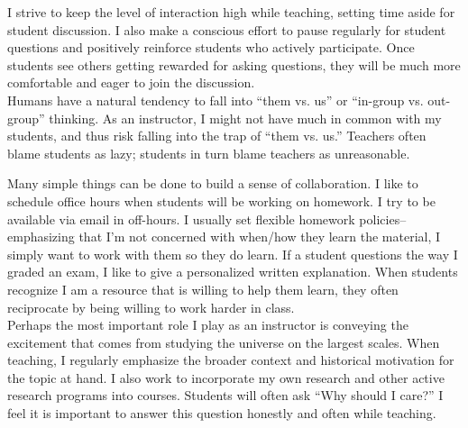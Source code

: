 \documentclass[11pt]{article}
\begin{document}
I strive to keep the level of interaction high while teaching, setting time aside for student discussion.  I also make a conscious effort to pause regularly for student questions and positively reinforce students who actively participate.  Once students see others getting rewarded for asking questions, they will be much more comfortable and eager to join the discussion. \\


 Humans have a natural tendency to fall into ``them vs. us'' or ``in-group vs. out-group'' thinking.  As an instructor, I might not have much in common with my students, and thus risk falling into the trap of ``them vs. us.''  Teachers often blame students as lazy; students in turn blame teachers as unreasonable.  

Many simple things can be done to build a sense of collaboration.  I like to schedule office hours when students will be working on homework.  I try to be available via email in off-hours.  I usually set flexible homework policies--emphasizing that I'm not concerned with when/how they learn the material, I simply want to work with them so they do learn.  If a student questions the way I graded an exam, I like to give a personalized written explanation.  When students recognize I am a resource that is willing to help them learn, they often reciprocate by being willing to work harder in class. \\


   Perhaps the most important role I play as an instructor is conveying the excitement that comes from studying the universe on the largest scales.  When teaching, I regularly emphasize the broader context and historical motivation for the topic at hand.  I also work to incorporate my own research and other active research programs into courses.  Students will often ask ``Why should I care?''  I feel it is important to answer this question honestly and often while teaching.   \\

\end{document}
